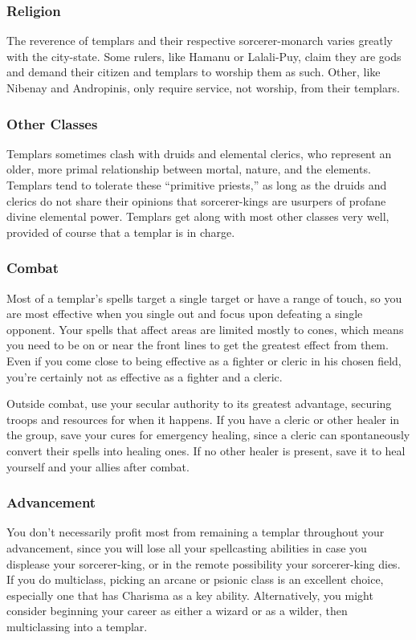\subsubsection{Religion}
The reverence of templars and their respective sorcerer-monarch varies greatly with the city-state. Some rulers, like Hamanu or Lalali-Puy, claim they are gods and demand their citizen and templars to worship them as such. Other, like Nibenay and Andropinis, only require service, not worship, from their templars.

\subsubsection{Other Classes}
Templars sometimes clash with druids and elemental clerics, who represent an older, more primal relationship between mortal, nature, and the elements. Templars tend to tolerate these ``primitive priests,'' as long as the druids and clerics do not share their opinions that sorcerer-kings are usurpers of profane divine elemental power. Templars get along with most other classes very well, provided of course that a templar is in charge.

\subsubsection{Combat}
Most of a templar's spells target a single target or have a range of touch, so you are most effective when you single out and focus upon defeating a single opponent. Your spells that affect areas are limited mostly to cones,
which means you need to be on or near the front lines to get the greatest effect from them. Even if you come close to being effective as a fighter or cleric in his chosen field, you're certainly not as effective as a fighter and a cleric.

Outside combat, use your secular authority to its greatest advantage, securing troops and resources for when it happens. If you have a cleric or other healer in the group, save your cures for emergency healing, since a cleric can spontaneously convert their spells into healing ones. If no other healer is present, save it to heal yourself and your allies after combat.

\subsubsection{Advancement}
You don't necessarily profit most from remaining a templar throughout your advancement, since you will lose all your spellcasting abilities in case you displease your sorcerer-king, or in the remote possibility your sorcerer-king dies. If you do multiclass, picking an arcane or psionic class is an excellent choice, especially one that has Charisma as a key ability. Alternatively, you might consider beginning your career as either a wizard or as a wilder, then multiclassing into a templar.

